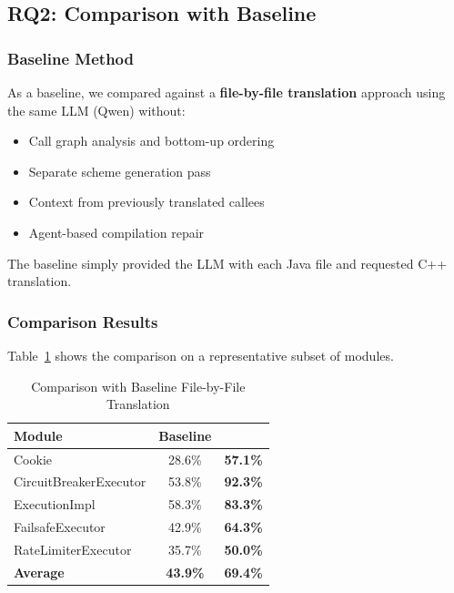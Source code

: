 \subsection{RQ2: Comparison with Baseline}

\subsubsection{Baseline Method}

As a baseline, we compared against a \textbf{file-by-file translation} approach using the same LLM (Qwen) without:
\begin{itemize}
\item Call graph analysis and bottom-up ordering
\item Separate scheme generation pass
\item Context from previously translated callees
\item Agent-based compilation repair
\end{itemize}

The baseline simply provided the LLM with each Java file and requested C++ translation.

\subsubsection{Comparison Results}

Table~\ref{tab:baseline-comparison} shows the comparison on a representative subset of modules.

\begin{table}[h]
\centering
\caption{Comparison with Baseline File-by-File Translation}
\label{tab:baseline-comparison}
\begin{tabular}{lcc}
\toprule
\textbf{Module} & \textbf{Baseline} & \textbf{\tool{}} \\
\midrule
Cookie & 28.6\% & \textbf{57.1\%} \\
CircuitBreakerExecutor & 53.8\% & \textbf{92.3\%} \\
ExecutionImpl & 58.3\% & \textbf{83.3\%} \\
FailsafeExecutor & 42.9\% & \textbf{64.3\%} \\
RateLimiterExecutor & 35.7\% & \textbf{50.0\%} \\
\midrule
\textbf{Average} & \textbf{43.9\%} & \textbf{69.4\%} \\
\bottomrule
\end{tabular}
\end{table}


